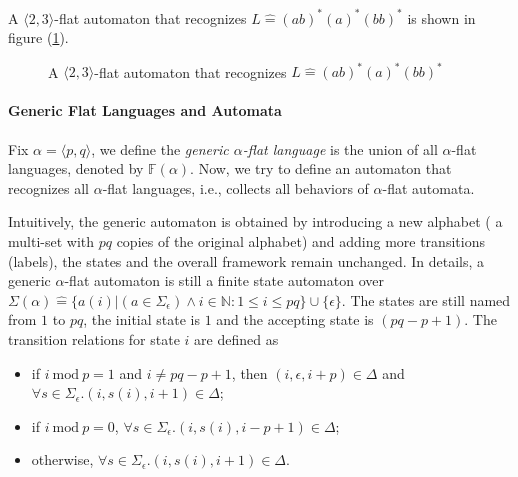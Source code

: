 \documentclass[runningheads]{llncs}
\newcommand{\Def}{\hat{=}}
\begin{document}
A $\langle 2,3 \rangle$-flat automaton 
that recognizes $L\Def  (ab)^*(a)^*(bb)^*$ is shown in 
figure (\ref{fig: FA}).


\begin{figure}[ht]
    \centering 
    \caption{A $\langle 2,3 \rangle$-flat automaton 
that recognizes $L\Def  (ab)^*(a)^*(bb)^*$}
    \label{fig: FA}
\end{figure}

 
\paragraph{Generic Flat Languages and Automata}
Fix $\alpha = \langle p,q \rangle$,
we define the \emph{generic $\alpha$-flat language} is the union of all $\alpha$-flat languages, denoted by $\mathbb{F}(\alpha)$.
Now, we try to define an automaton that recognizes all $\alpha$-flat languages,
i.e., collects all behaviors of $\alpha$-flat automata.

Intuitively, 
the generic automaton is obtained by introducing a new alphabet (
a multi-set with $p q$ copies of the original alphabet) and 
adding more transitions (labels),
the states and the overall framework remain unchanged. 
In details, a generic $\alpha$-flat automaton is still a finite state automaton over
$\Sigma(\alpha)\Def \{a(i)| (a\in \Sigma_\epsilon) \wedge i\in \mathbb{N}:1\le i \le pq\}\cup \{\epsilon\}$.
The states are still named from $1$ to $pq$, 
the initial state is $1$ and the accepting state is $(pq-p+1)$.
The transition relations for state $i$ are defined as 
\begin{itemize}
    \item if $i\  \text{mod}\  p = 1$ and $i\neq pq-p+1$, then 
    $(i,\epsilon,i+p)\in \Delta$
    and $\forall s\in \Sigma_{\epsilon}. (i, s(i) ,i+1) \in \Delta$;
    \item if $i\  \text{mod}\  p = 0$, 
    $\forall s \in \Sigma_{\epsilon}. (i,s(i), i-p+1) \in \Delta$;
    \item otherwise, $\forall s \in \Sigma_{\epsilon}. (i,s(i), i+1) \in \Delta$.
\end{itemize}
\end{document}
